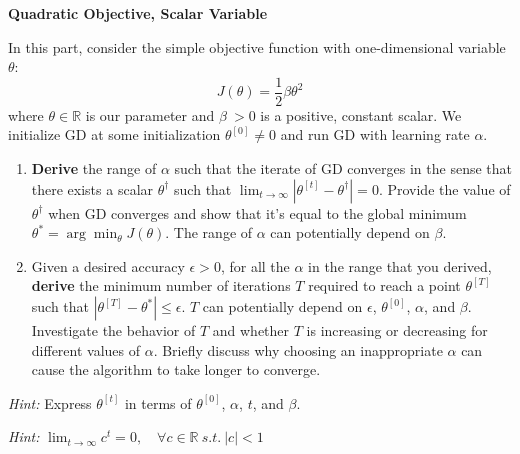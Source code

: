 \item {} {\bf Quadratic Objective, Scalar Variable}

In this part, consider the simple objective function with one-dimensional variable $\theta$:
\begin{equation*}
	J(\theta) = \frac{1}{2}\beta\theta^2
\end{equation*}
where $\theta \in\mathbb{R}$ is our parameter and $\beta\ > 0$ is a positive, constant scalar.
We initialize GD at some initialization $\theta^{[0]} \neq 0$ and run GD with learning rate $\alpha$. 

\begin{enumerate}
	\item \textbf{Derive} the range of $\alpha$ such that the iterate of GD converges in the sense that there exists a scalar $\theta^\dagger$ such that $\lim_{t\to\infty} |\theta^{[t]}-\theta^\dagger| = 0$.   Provide the value of $\theta^\dagger$ when GD converges and show that it's equal to the global minimum $\theta^* = \arg\min_\theta J(\theta)$. The range of $\alpha$ can potentially depend on $\beta$. 
	\item Given a desired accuracy $\epsilon > 0$, for all the $\alpha$ in the range that you derived, \textbf{derive} the minimum number of iterations $T$ required to reach a point $\theta^{[T]}$ such that $|\theta^{[T]} - \theta^*| \le \epsilon$. $T$ can potentially depend on $\epsilon$, $\theta^{[0]}$, $\alpha$, and $\beta$. Investigate the behavior of $T$ and whether $T$ is increasing or decreasing for different values of $\alpha$. Briefly discuss why choosing an inappropriate $\alpha$ can cause the algorithm to take longer to converge.
\end{enumerate}

\textit{Hint:} Express $\theta^{[t]}$ in terms of $\theta^{[0]}$, $\alpha$, $t$, and $\beta$. 

\textit{Hint:} $\lim_{t\to\infty} c^t = 0, \quad\forall c\in\mathbb{R} \ s.t.\ |c|<1$ 
